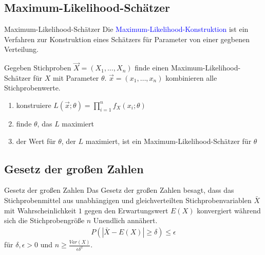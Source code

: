 \documentclass{beamer}
\def\padding{\vspace{0.5cm}}
\def\b{\textcolor{blue}}
\begin{document}
\subsection{Maximum-Likelihood-Schätzer}
\begin{frame}{Maximum-Likelihood-Schätzer}
    Die \b{Maximum-Likelihood-Konstruktion} ist ein Verfahren zur Konstruktion eines Schätzers für Parameter von einer gegbenen Verteilung.\pause\par\padding
    Gegeben Stichproben $\overrightarrow{X} = (X_1, \dots, X_n)$ finde einen Maximum-Likelihood-Schätzer für $X$ mit Parameter $\theta$. $\overrightarrow{x} = (x_1, \dots, x_n)$ kombinieren alle Stichprobenwerte.
    \begin{enumerate}
        \item konstruiere $L(\overrightarrow{x}; \theta) = \prod_{i=1}^n f_X(x_i; \theta)$
        \item finde $\theta$, das $L$ maximiert
        \item der Wert für $\theta$, der $L$ maximiert, ist ein Maximum-Likelihood-Schätzer für $\theta$
    \end{enumerate}
\end{frame}

\subsection{Gesetz der großen Zahlen}
\begin{frame}{Gesetz der großen Zahlen}
    Das Gesetz der großen Zahlen besagt, dass das Stichprobenmittel aus unabhängigen und gleichverteilten Stichprobenvariablen $\bar{X}$ mit Wahrscheinlichkeit $1$ gegen den Erwartungswert $E(X)$ konvergiert während sich die Stichprobengröße $n$ Unendlich annähert.\pause
    \begin{align*}
        P(|\bar{X} - E(X)| \geq \delta) \leq \epsilon
    \end{align*}
    für $\delta, \epsilon > 0$ und $n \geq \frac{Var(X)}{\epsilon \delta^2}$.
\end{frame}
\end{document}
